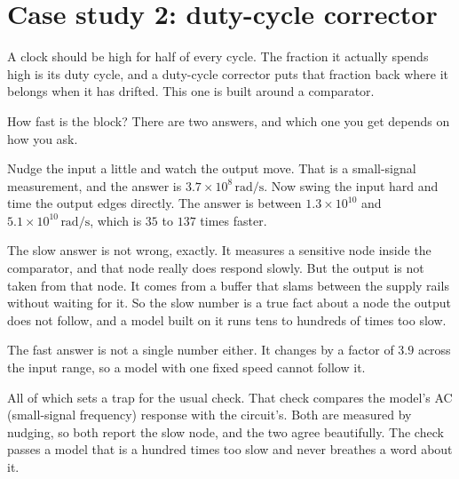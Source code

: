 \documentclass[11pt,a4paper]{article}
\newcommand{\unit}[1]{\,\textrm{#1}}
\begin{document}
\vspace{-0.4em}
\vspace{0.6em}

\section{Case study 2: duty-cycle corrector}
\label{sec:dcc}

A clock should be high for half of every cycle. The fraction it
actually spends high is its duty cycle, and a duty-cycle corrector
puts that fraction back where it belongs when it has drifted. This one
is built around a comparator.

How fast is the block? There are two answers, and which one you get
depends on how you ask.

Nudge the input a little and watch the output move. That is a
small-signal measurement, and the answer is
$3.7\times10^{8}\unit{rad/s}$. Now swing the input hard and time the
output edges directly. The answer is between $1.3\times10^{10}$ and
$5.1\times10^{10}\unit{rad/s}$, which is $35$ to $137$ times faster.

The slow answer is not wrong, exactly. It measures a sensitive node
inside the comparator, and that node really does respond slowly. But
the output is not taken from that node. It comes from a buffer that
slams between the supply rails without waiting for it. So the slow
number is a true fact about a node the output does not follow, and a
model built on it runs tens to hundreds of times too slow.

The fast answer is not a single number either. It changes by a factor
of $3.9$ across the input range, so a model with one fixed speed
cannot follow it.

All of which sets a trap for the usual check. That check compares the
model's AC (small-signal frequency) response with the circuit's. Both
are measured by nudging, so both report the slow node, and the two
agree beautifully. The check passes a model that is a hundred times
too slow and never breathes a word about it.
\end{document}
